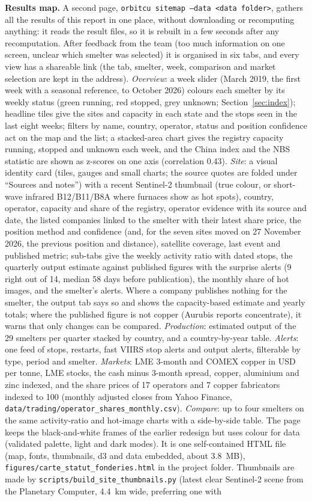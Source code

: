 \documentclass[10pt,a4paper]{article}
\newcommand{\code}[1]{\texttt{\small #1}}
\begin{document}
\textbf{Results map.} A second page, \code{orbitcu sitemap --data <data folder>}, gathers all the results of this report in one place, without downloading or recomputing anything: it reads the result files, so it is rebuilt in a few seconds after any recomputation. After feedback from the team (too much information on one screen, unclear which smelter was selected) it is organised in six tabs, and every view has a shareable link (the tab, smelter, week, comparison and market selection are kept in the address). \emph{Overview}: a week slider (March 2019, the first week with a seasonal reference, to October 2026) colours each smelter by its weekly status (green running, red stopped, grey unknown; Section~\ref{sec:index}); headline tiles give the sites and capacity in each state and the stops seen in the last eight weeks; filters by name, country, operator, status and position confidence act on the map and the list; a stacked-area chart gives the registry capacity running, stopped and unknown each week, and the China index and the NBS statistic are shown as z-scores on one axis (correlation 0.43). \emph{Site}: a visual identity card (tiles, gauges and small charts; the source quotes are folded under ``Sources and notes'') with a recent Sentinel-2 thumbnail (true colour, or short-wave infrared B12/B11/B8A where furnaces show as hot spots), country, operator, capacity and share of the registry, operator evidence with its source and date, the listed companies linked to the smelter with their latest share price, the position method and confidence (and, for the seven sites moved on 27 November 2026, the previous position and distance), satellite coverage, last event and published metric; sub-tabs give the weekly activity ratio with dated stops, the quarterly output estimate against published figures with the surprise alerts (9 right out of 14, median 58 days before publication), the monthly share of hot images, and the smelter's alerts. Where a company publishes nothing for the smelter, the output tab says so and shows the capacity-based estimate and yearly totals; where the published figure is not copper (Aurubis reports concentrate), it warns that only changes can be compared. \emph{Production}: estimated output of the 29 smelters per quarter stacked by country, and a country-by-year table. \emph{Alerts}: one feed of stops, restarts, fast VIIRS stop alerts and output alerts, filterable by type, period and smelter. \emph{Markets}: LME 3-month and COMEX copper in USD per tonne, LME stocks, the cash minus 3-month spread, copper, aluminium and zinc indexed, and the share prices of 17 operators and 7 copper fabricators indexed to 100 (monthly adjusted closes from Yahoo Finance, \code{data/trading/operator\_shares\_monthly.csv}). \emph{Compare}: up to four smelters on the same activity-ratio and hot-image charts with a side-by-side table. The page keeps the black-and-white frames of the earlier redesign but uses colour for data (validated palette, light and dark modes). It is one self-contained HTML file (map, fonts, thumbnails, d3 and data embedded, about 3.8~MB), \code{figures/carte\_statut\_fonderies.html} in the project folder. Thumbnails are made by \code{scripts/build\_site\_thumbnails.py} (latest clear Sentinel-2 scene from the Planetary Computer, 4.4~km wide, preferring one with 
\end{document}
